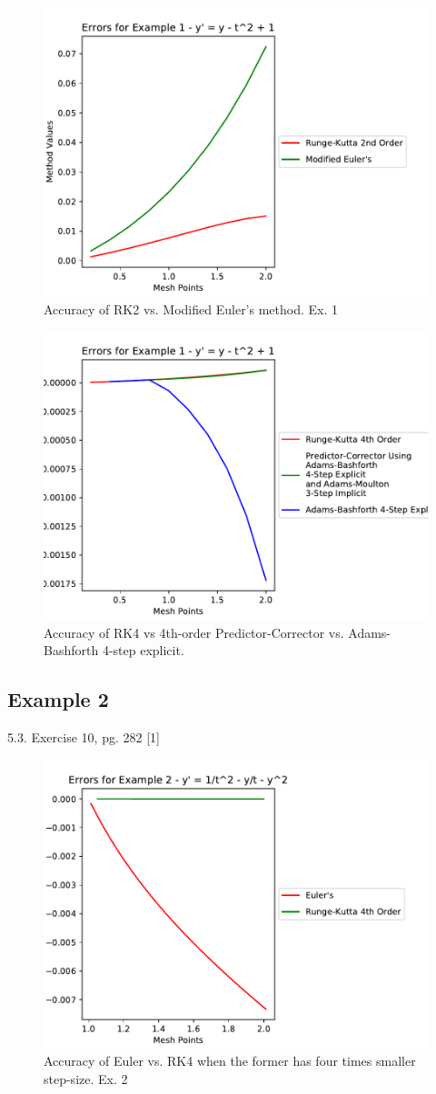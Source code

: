 \documentclass[11pt]{article}	%
\begin{document}
\begin{figure}[H]
\centering
\includegraphics[width=.45\textwidth]{rk2_meuler_1}
\caption{Accuracy of RK2 vs. Modified Euler's method. Ex. 1}
\label{fig:rk2_meuler_1}
\end{figure}

\begin{figure}[H]
\centering
\includegraphics[width=.45\textwidth]{rk4_predictor_ab4_1}
\caption{Accuracy of RK4 vs  4th-order Predictor-Corrector vs. Adams-Bashforth 4-step explicit.}
\label{fig:rk4_predictor_ab4_1}
\end{figure}

\vfill
\clearpage

\newpage
\subsection{Example 2}
5.3. Exercise 10, pg. 282 [1]
\begin{figure}[H]
\centering
\includegraphics[width=.4\textwidth]{euler_rk4_2}
\caption{Accuracy of Euler vs. RK4 when the former has four times smaller step-size. Ex. 2}
\label{fig:euler_rk4_2}
\end{figure}
\end{document}
